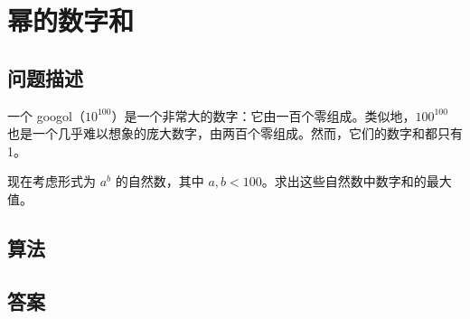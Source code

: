 \section{幂的数字和}
\subsection{问题描述}
\begin{tcolorbox}
一个 googol（$10^{100}$）是一个非常大的数字：它由一百个零组成。类似地，$100^{100}$ 也是一个几乎难以想象的庞大数字，由两百个零组成。然而，它们的数字和都只有 1。

现在考虑形式为 $a^b$ 的自然数，其中 $a, b < 100$。求出这些自然数中数字和的最大值。
\end{tcolorbox}

\subsection{算法}


\subsection{答案}
